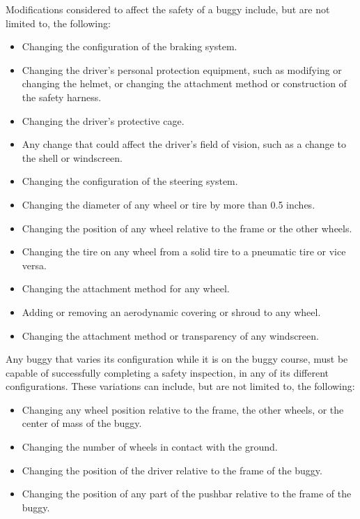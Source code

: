 	Modifications considered to affect the safety of a buggy include, but are
	not limited to, the following:
	
	\begin{itemize}
		\item Changing the configuration of the braking system.
		\item Changing the driver's personal protection equipment, such as modifying or
				changing the helmet, or changing the attachment method or construction of the
				safety harness.
		\item Changing the driver's protective cage.
		\item Any change that could affect the driver's field of vision, such as a change to the shell or windscreen.
		\item Changing the configuration of the steering system.
		\item Changing the diameter of any wheel or tire by more than 0.5 inches.
		\item Changing the position of any wheel relative to the frame or the other wheels.
		\item Changing the tire on any wheel from a solid tire to a pneumatic tire or vice versa.
		\item Changing the attachment method for any wheel.
		\item Adding or removing an aerodynamic covering or shroud to any wheel.
		\item Changing the attachment method or transparency of any windscreen.
	\end{itemize}

	Any buggy that varies its configuration while it is on the buggy course, must
	be capable of successfully completing a safety inspection, in any of its
	different configurations. These variations can include, but are not limited to,
	the following:

	\begin{itemize}
		\item Changing any wheel position relative to the frame, the other wheels, or the center of mass of the buggy.
		\item Changing the number of wheels in contact with the ground.
		\item Changing the position of the driver relative to the frame of the buggy.
		\item Changing the position of any part of the pushbar relative to the frame of the buggy.
	\end{itemize}

